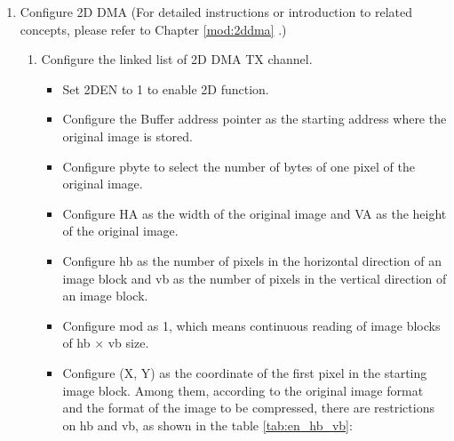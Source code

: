 \documentclass[main\_\_EN.tex]{subfiles}
\begin{document}
\begin{enumerate}
\begin{itemize}
\begin{itemize}
            \item 1: enable
        \end{itemize}
        \item Select the image format to be compressed by configuring \hyperref[fielddesc:JPEGSAMPLESEL]{JPEG\_SAMPLE\_SEL}:
                \begin{itemize}
                    \item 0: YUV444
                    \item 1: YUV422
                    \item 2: YUV420
                \end{itemize}
        Note that this register is valid only when the original image format is RGB. See details in Table \ref{tab:csc_result}.
        \item Configure \hyperref[fielddesc:JPEGHA]{JPEG\_HA} as the original image width and \hyperref[fielddesc:JPEGVA]{JPEG\_VA} as the original image height.
        \item Configure the quantization coefficient table by following the instructions in Section \ref{sec:jpegcodec-enc-qnr}.
    \end{itemize}
    \item Configure 2D DMA (For detailed instructions or introduction to related concepts, please refer to Chapter \ref{mod:2ddma} \textit{}.)
    \begin{enumerate}
        \item Configure the linked list of 2D DMA TX channel.
        \begin{itemize}
            \item Set 2DEN to 1 to enable 2D function.
            \item Configure the Buffer address pointer as the starting address where the original image is stored.
            \item Configure pbyte to select the number of bytes of one pixel of the original image.
            \item Configure HA as the width of the original image and VA as the height of the original image.
            \item Configure hb as the number of pixels in the horizontal direction of an image block and vb as the number of pixels in the vertical direction of an image block.
            \item Configure mod as 1, which means continuous reading of image blocks of hb × vb size.
            \item Configure (X, Y) as the coordinate of the first pixel in the starting image block. Among them, according to the original image format and the format of the image to be compressed, there are restrictions on hb and vb, as shown in the table \ref{tab:en_hb_vb}:


\end{itemize}
\end{enumerate}
\end{enumerate}
\end{document}
